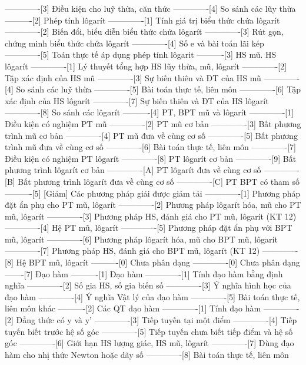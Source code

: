 -------------[3] Điều kiện cho luỹ thừa, căn thức
-------------[4] So sánh các lũy thừa
----------[2] Phép tính lôgarít
-------------[1] Tính giá trị biểu thức chứa lôgarít
-------------[2] Biến đổi, biểu diễn biểu thức chứa lôgarít
-------------[3] Rút gọn, chứng minh biểu thức chứa lôgarít
-------------[4] Số e và bài toán lãi kép
-------------[5] Toán thực tế áp dụng phép tính lôgarit
----------[3] HS mũ. HS lôgarít
-------------[1] Lý thuyết tổng hợp HS lũy thừa, mũ, lôgarít
-------------[2] Tập xác định của HS mũ
-------------[3] Sự biến thiên và ĐT của HS mũ
-------------[4] So sánh các luỹ thừa
-------------[5] Bài toán thực tế, liên môn
-------------[6] Tập xác định của HS lôgarít
-------------[7] Sự biến thiên và ĐT của HS lôgarít
-------------[8] So sánh các lôgarít
----------[4] PT, BPT mũ và lôgarít
-------------[1] Điều kiện có nghiệm PT mũ
-------------[2] PT mũ cơ bản
-------------[3] Bất phương trình mũ cơ bản
-------------[4] PT mũ đưa về cùng cơ số
-------------[5] Bất phương trình mũ đưa về cùng cơ số
-------------[6] Bài toán thực tế, liên môn
-------------[7] Điều kiện có nghiệm PT lôgarít
-------------[8] PT lôgarít cơ bản
-------------[9] Bất phương trình lôgarít cơ bản
-------------[A] PT lôgarít đưa về cùng cơ số
-------------[B] Bất phương trình lôgarít đưa về cùng cơ số
-------------[C] PT BPT có tham số
----------[5] [Giảm] Các phương pháp giải được giảm tải
-------------[1] Phương pháp đặt ẩn phụ cho PT mũ, lôgarít
-------------[2] Phương pháp lôgarít hóa, mũ cho PT mũ, lôgarít
-------------[3] Phương pháp HS, đánh giá cho PT mũ, lôgarít (KT 12)
-------------[4] Hệ PT mũ, lôgarít
-------------[5] Phương pháp đặt ẩn phụ với BPT mũ, lôgarít
-------------[6] Phương pháp lôgarít hóa, mũ cho BPT mũ, lôgarít
-------------[7] Phương pháp HS, đánh giá cho BPT mũ, lôgarít (KT 12)
-------------[8] Hệ BPT mũ, lôgarít
----------[0] Chưa phân dạng
-------------[0] Chưa phân dạng
-------[7] Đạo hàm
----------[1] Đạo hàm
-------------[1] Tính đạo hàm bằng định nghĩa
-------------[2] Số gia HS, số gia biến số
-------------[3] Ý nghĩa hình học của đạo hàm
-------------[4] Ý nghĩa Vật lý của đạo hàm
-------------[5] Bài toán thực tế, liên môn khác
----------[2] Các QT đạo hàm
-------------[1] Tính đạo hàm
-------------[2] Đẳng thức có y và y'
-------------[3] Tiếp tuyến tại một điểm
-------------[4] Tiếp tuyến biết trước hệ số góc
-------------[5] Tiếp tuyến chưa biết tiếp điểm và hệ số góc
-------------[6] Giới hạn HS lượng giác, HS mũ, lôgarít
-------------[7] Dùng đạo hàm cho nhị thức Newton hoặc dãy số
-------------[8] Bài toán thực tế, liên môn
